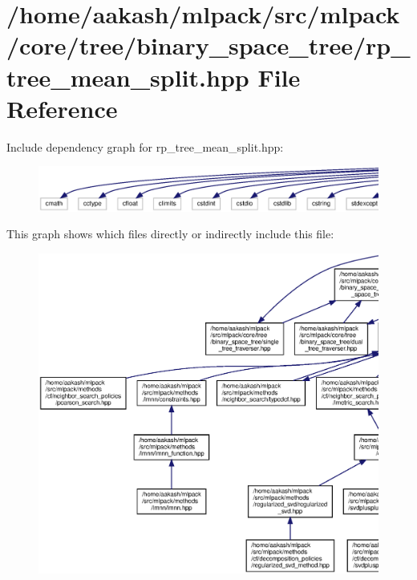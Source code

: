 \section{/home/aakash/mlpack/src/mlpack/core/tree/binary\+\_\+space\+\_\+tree/rp\+\_\+tree\+\_\+mean\+\_\+split.hpp File Reference}
\label{rp__tree__mean__split_8hpp}
Include dependency graph for rp\+\_\+tree\+\_\+mean\+\_\+split.\+hpp\+:
\nopagebreak
\begin{figure}[H]
\begin{center}
\leavevmode
\includegraphics[width=350pt]{rp__tree__mean__split_8hpp__incl}
\end{center}
\end{figure}
This graph shows which files directly or indirectly include this file\+:
\nopagebreak
\begin{figure}[H]
\begin{center}
\leavevmode
\includegraphics[width=350pt]{rp__tree__mean__split_8hpp__dep__incl}
\end{center}
\end{figure}
